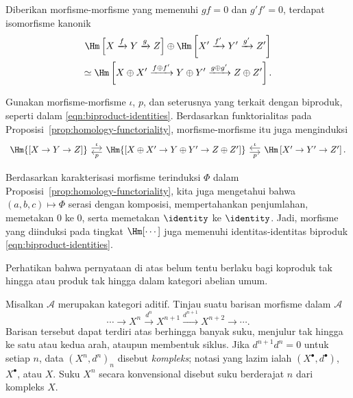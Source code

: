 \begin{proposisi}\label{prop:homology-biproduct}
	Diberikan morfisme-morfisme yang memenuhi $gf = 0$ dan $g' f' = 0$,
	terdapat isomorfisme kanonik
	\begin{multline*}
		\Hm\left[ X \xrightarrow{f} Y \xrightarrow{g} Z \right] \oplus \Hm\left[ X' \xrightarrow{f'} Y' \xrightarrow{g'} Z' \right] \\
		\simeq \Hm\left[ X \oplus X' \xrightarrow{f \oplus f'} Y \oplus Y' \xrightarrow{g \oplus g'} Z \oplus Z' \right].
	\end{multline*}
\end{proposisi}

\begin{bukti}
	Gunakan morfisme-morfisme $\iota$, $p$, dan seterusnya yang terkait dengan
	biproduk, seperti dalam \eqref{eqn:biproduct-identities}. Berdasarkan
	funktorialitas pada Proposisi~\ref{prop:homology-functoriality},
	morfisme-morfisme itu juga menginduksi
	\[\begin{tikzcd}[column sep=small]
		\Hm{\left[ X \to Y \to Z \right]} \arrow[shift left, r, "\iota"] & \Hm{\left[ X \oplus X' \to Y \oplus Y' \to Z \oplus Z' \right]} \arrow[shift left, l, "p"] \arrow[shift right, r, "p"'] & \Hm\left[ X' \to Y' \to Z' \right] \arrow[shift right, l, "\iota"'].
	\end{tikzcd}\]

	Berdasarkan karakterisasi morfisme terinduksi $\Phi$ dalam
	Proposisi~\ref{prop:homology-functoriality}, kita juga mengetahui bahwa
	$(a,b,c) \mapsto \Phi$ serasi dengan komposisi, mempertahankan penjumlahan,
	memetakan $0$ ke $0$, serta memetakan $\identity$ ke $\identity$. Jadi,
	morfisme yang diinduksi pada tingkat $\Hm[\cdots]$ juga memenuhi
	identitas-identitas biproduk \eqref{eqn:biproduct-identities}.
\end{bukti}

Perhatikan bahwa pernyataan di atas belum tentu berlaku bagi koproduk tak
hingga atau produk tak hingga dalam kategori abelian umum.
\begin{definisi}[Kompleks]\label{def:complex}
	Misalkan $\mathcal{A}$ merupakan kategori aditif. Tinjau suatu barisan
	morfisme dalam $\mathcal{A}$
	\[ \cdots \to X^n \xrightarrow{d^n} X^{n+1} \xrightarrow{d^{n+1}} X^{n+2} \to \cdots. \]
	Barisan tersebut dapat terdiri atas berhingga banyak suku, menjulur tak
	hingga ke satu atau kedua arah, ataupun membentuk siklus. Jika
	$d^{n+1} d^n = 0$ untuk setiap $n$, data $(X^n, d^n)_n$ disebut
	\emph{kompleks}; notasi yang lazim ialah $(X^\bullet, d^\bullet)$,
	$X^\bullet$, atau $X$. Suku $X^n$ secara konvensional disebut suku
	berderajat $n$ dari kompleks $X$.
\end{definisi}

